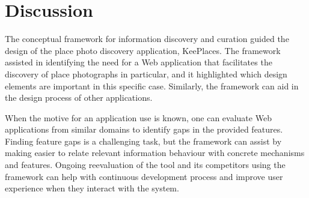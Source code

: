 {\section{Discussion}
The conceptual framework for information discovery and curation guided the design of the place photo discovery application, KeePlaces. The framework assisted in identifying the need for a Web application that facilitates the discovery of place photographs in particular, and it highlighted which design elements are important in this specific case. Similarly, the framework can aid in the design process of other applications. 

When the motive for an application use is known, one can evaluate Web applications from similar domains to identify gaps in the provided features. Finding feature gaps is a challenging task, but the framework can assist by making easier to relate relevant information behaviour with concrete mechanisms and features. Ongoing reevaluation of the tool and its competitors using the framework can help with continuous development process and improve user experience when they interact with the system.
} %




